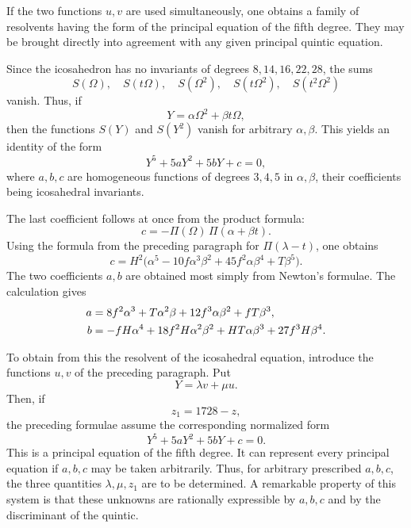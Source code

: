 \documentclass[11pt,a4paper]{book}
\newcommand{\omegaT}{\Omega}
\begin{document}
If the two functions $u,v$ are used simultaneously, one obtains a family of resolvents having the form of the principal equation of the fifth degree.  They may be brought directly into agreement with any given principal quintic equation.

Since the icosahedron has no invariants of degrees $8,14,16,22,28$, the sums
\[
 S(\omegaT),\quad S(t\omegaT),\quad S(\omegaT^2),\quad S(t\omegaT^2),\quad S(t^2\omegaT^2)
\]
vanish.  Thus, if
\begin{equation}
 Y=\alpha\omegaT^2+\beta t\omegaT,
\end{equation}
then the functions $S(Y)$ and $S(Y^2)$ vanish for arbitrary $\alpha,\beta$.  This yields an identity of the form
\begin{equation}
 Y^5+5aY^2+5bY+c=0,
\end{equation}
where $a,b,c$ are homogeneous functions of degrees $3,4,5$ in $\alpha,
\beta$, their coefficients being icosahedral invariants.

The last coefficient follows at once from the product formula:
\begin{equation}
 c=-\Pi(\omegaT)\,\Pi(\alpha+\beta t).
\end{equation}
Using the formula from the preceding paragraph for $\Pi(\lambda-t)$, one obtains
\begin{equation}
 c=H^2\bigl(\alpha^5-10f\alpha^3\beta^2+45f^2\alpha\beta^4+T\beta^5\bigr).
\end{equation}
The two coefficients $a,b$ are obtained most simply from Newton's formulae.  The calculation gives
\begin{align}
 a&=8f^2\alpha^3+T\alpha^2\beta+12f^3\alpha\beta^2+fT\beta^3,\notag\\
 b&=-fH\alpha^4+18f^2H\alpha^2\beta^2+HT\alpha\beta^3+27f^3H\beta^4.
\end{align}

To obtain from this the resolvent of the icosahedral equation, introduce the functions $u,v$ of the preceding paragraph.  Put
\begin{equation}
 Y=\lambda v+\mu u.
\end{equation}
Then, if
\begin{equation}
 z_1=1728-z,
\end{equation}
the preceding formulae assume the corresponding normalized form
\begin{equation}
 Y^5+5aY^2+5bY+c=0.
\end{equation}
This is a principal equation of the fifth degree.  It can represent every principal equation if $a,b,c$ may be taken arbitrarily.  Thus, for arbitrary prescribed $a,b,c$, the three quantities $\lambda,\mu,z_1$ are to be determined.  A remarkable property of this system is that these unknowns are rationally expressible by $a,b,c$ and by the discriminant of the quintic.
\end{document}
